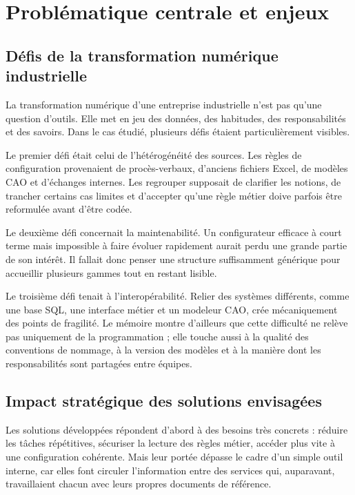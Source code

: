 \section{Problématique centrale et enjeux}

\subsection{Défis de la transformation numérique industrielle}

La transformation numérique d'une entreprise industrielle n'est pas qu'une question d'outils. Elle met en jeu des données, des habitudes, des responsabilités et des savoirs. Dans le cas étudié, plusieurs défis étaient particulièrement visibles.

Le premier défi était celui de l'hétérogénéité des sources. Les règles de configuration provenaient de procès-verbaux, d'anciens fichiers Excel, de modèles CAO et d'échanges internes. Les regrouper supposait de clarifier les notions, de trancher certains cas limites et d'accepter qu'une règle métier doive parfois être reformulée avant d'être codée.

Le deuxième défi concernait la maintenabilité. Un configurateur efficace à court terme mais impossible à faire évoluer rapidement aurait perdu une grande partie de son intérêt. Il fallait donc penser une structure suffisamment générique pour accueillir plusieurs gammes tout en restant lisible.

Le troisième défi tenait à l'interopérabilité. Relier des systèmes différents, comme une base SQL, une interface métier et un modeleur CAO, crée mécaniquement des points de fragilité. Le mémoire montre d'ailleurs que cette difficulté ne relève pas uniquement de la programmation ; elle touche aussi à la qualité des conventions de nommage, à la version des modèles et à la manière dont les responsabilités sont partagées entre équipes.

\subsection{Impact stratégique des solutions envisagées}

Les solutions développées répondent d'abord à des besoins très concrets : réduire les tâches répétitives, sécuriser la lecture des règles métier, accéder plus vite à une configuration cohérente. Mais leur portée dépasse le cadre d'un simple outil interne, car elles font circuler l'information entre des services qui, auparavant, travaillaient chacun avec leurs propres documents de référence.

